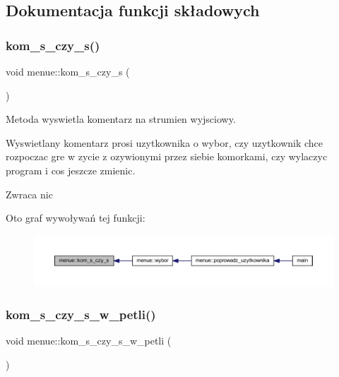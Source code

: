 \subsection{Dokumentacja funkcji składowych}
\mbox{\label{classmenue_a1f0607fc914414d432e6612a0e20668d}} 
\subsubsection{\texorpdfstring{kom\+\_\+s\+\_\+czy\+\_\+s()}{kom\_s\_czy\_s()}}
{\footnotesize\ttfamily void menue\+::kom\+\_\+s\+\_\+czy\+\_\+s (\begin{DoxyParamCaption}{ }\end{DoxyParamCaption})\hspace{0.3cm}{\ttfamily [static]}}

Metoda wyswietla komentarz na strumien wyjsciowy.

Wyswietlany komentarz prosi uzytkownika o wybor, czy uzytkownik chce rozpoczac gre w zycie z ozywionymi przez siebie komorkami, czy wylaczyc program i cos jeszcze zmienic. \begin{DoxyReturn}{Zwraca}
nic 
\end{DoxyReturn}
Oto graf wywoływań tej funkcji\+:
\nopagebreak
\begin{figure}[H]
\begin{center}
\leavevmode
\includegraphics[width=350pt]{classmenue_a1f0607fc914414d432e6612a0e20668d_icgraph}
\end{center}
\end{figure}
\mbox{\label{classmenue_a4c13c8e43e1fe3c1eaf62543c126a6b7}} 
\subsubsection{\texorpdfstring{kom\+\_\+s\+\_\+czy\+\_\+s\+\_\+w\+\_\+petli()}{kom\_s\_czy\_s\_w\_petli()}}
{\footnotesize\ttfamily void menue\+::kom\+\_\+s\+\_\+czy\+\_\+s\+\_\+w\+\_\+petli (\begin{DoxyParamCaption}{ }\end{DoxyParamCaption})\hspace{0.3cm}{\ttfamily [static]}}

